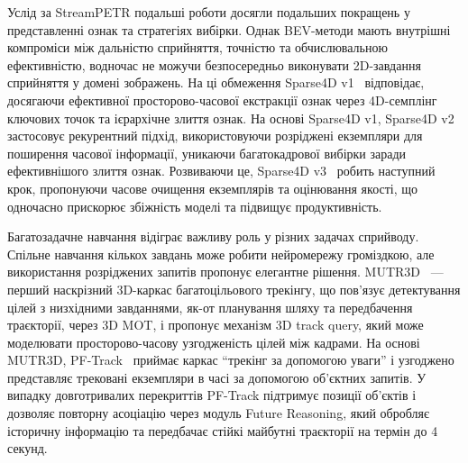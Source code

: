 Услід за StreamPETR подальші роботи досягли подальших покращень у представленні ознак та стратегіях вибірки.
Однак BEV-методи мають внутрішні компроміси між дальністю сприйняття, точністю та обчислювальною ефективністю, водночас не можучи безпосередньо виконувати 2D-завдання сприйняття у домені зображень.
На ці обмеження Sparse4D v1~\cite{2211.10581} відповідає, досягаючи ефективної просторово-часової екстракції ознак через 4D-семплінг ключових точок та ієрархічне злиття ознак.
На основі Sparse4D v1, Sparse4D v2~\cite{lin2023sparse4d} застосовує рекурентний підхід, використовуючи розріджені екземпляри для поширення часової інформації, уникаючи багатокадрової вибірки заради ефективнішого злиття ознак.
Розвиваючи це, Sparse4D v3~\cite{2311.11722} робить наступний крок, пропонуючи часове очищення екземплярів та оцінювання якості, що одночасно прискорює збіжність моделі та підвищує продуктивність.

Багатозадачне навчання відіграє важливу роль у різних задачах сприйводу. Спільне навчання кількох завдань може робити нейромережу громіздкою, але використання розріджених запитів пропонує елегантне рішення.
MUTR3D~\cite{zhang2022mutr3d} — перший наскрізний 3D-каркас багатоцільового трекінгу, що пов'язує детектування цілей з низхідними завданнями, як-от планування шляху та передбачення траєкторії, через 3D MOT, і пропонує механізм 3D track query, який може моделювати просторово-часову узгодженість цілей між кадрами.
На основі MUTR3D, PF-Track~\cite{pang2023standing} приймає каркас ``трекінг за допомогою уваги'' і узгоджено представляє трековані екземпляри в часі за допомогою об'єктних запитів. У випадку довготривалих перекриттів PF-Track підтримує позиції об'єктів і дозволяє повторну асоціацію через модуль Future Reasoning, який обробляє історичну інформацію та передбачає стійкі майбутні траєкторії на термін до 4 секунд.


